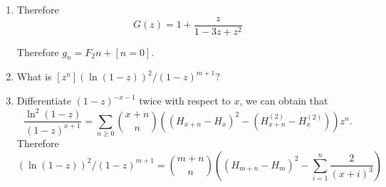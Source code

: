 \documentclass[12pt,a4paper]{ctexart}
\makeatletter
\newtheorem*{solution}{Solution}
\theoremstyle{definition}
\renewenvironment{solution}[1][Solution] {\par\pushQED{\qed}\normalfont\topsep6\p@\@plus6\p@\relax\trivlist\item[\hskip\labelsep\bfseries#1\@addpunct{.}]\ignorespaces}{\popQED\endtrivlist\@endpefalse} \makeatother
\makeatother
\begin{document}
\begin{enumerate}
\begin{solution}
            Therefore 
            \begin{equation*}
                G(z)=1+\frac{z}{1-3z+z^2}
            \end{equation*}
            
            Therefore $g_n=F_2n+[n=0]$.
        \end{solution}
    \item 
        What is $[z^n](\ln (1-z))^2/(1-z)^{m+1}$?
        \begin{solution}
        	Differentiate $(1-z)^{-x-1}$ twice with respect to $x$, we can obtain that
        	\begin{equation}\label{E1}
        	    \frac{\ln^2(1-z)}{(1-z)^{x+1}}=\sum_{n \ge 0}\binom{x+n}{n}((H_{x+n}-H_x)^2-(H_{x+n}^{(2)}-H_x^{(2)}))z^n.
        	\end{equation}
        	Therefore 
        	\begin{equation*}
        	    [z^n](\ln (1-z))^2/(1-z)^{m+1}=\binom{m+n}{n}((H_{m+n}-H_m)^2-\sum_{i=1}^{n}\frac{2}{(x+i)^3})
        	\end{equation*}
        	

\end{solution}
\end{enumerate}
\end{document}
